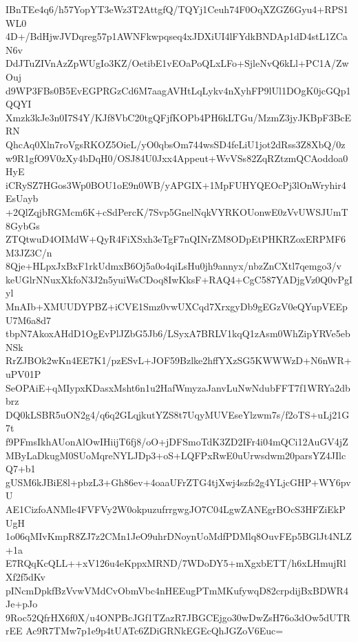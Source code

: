 IBnTEe4q6/h57YopYT3eWz3T2AttgfQ/TQYj1Ceuh74F0OqXZGZ6Gyu4+RPS1WL0
4D+/BdHjwJVDqreg57p1AWNFkwpqseq4xJDXiUI4lFYdkBNDAp1dD4stL1ZCaN6v
DdJTuZIVnAzZpWUgIo3KZ/OetibE1vEOaPoQLxLFo+SjleNvQ6kLl+PC1A/ZwOuj
d9WP3FBs0B5EvEGPRGzCd6M7aagAVHtLqLykv4nXyhFP9lUl1DOgK0jcGQp1QQYI
Xmzk3kJe3n0I7S4Y/KJf8VbC20tgQFjfKOPb4PH6kLTGu/MzmZ3jyJKBpF3BcERN
QhcAq0Xln7roVgsRKOZ5OieL/yO0qbsOm744wsSD4feLiU1jot2dRss3Z8XbQ/0z
w9R1gfO9V0zXy4bDqH0/OSJ84U0Jxx4Appeut+WvVSs82ZqRZtzmQCAoddoa0HyE
iCRySZ7HGos3Wp0BOU1oE9n0WB/yAPGIX+1MpFUHYQEOcPj3lOnWryhir4EsUayb
+2QlZqjbRGMcm6K+cSdPercK/7Svp5GnelNqkVYRKOUonwE0zVvUWSJUmT8GybGs
ZTQtwuD4OIMdW+QyR4FiXSxh3eTgF7nQINrZM8ODpEtPHKRZoxERPMF6M3JZ3C/n
8Qje+HLpxJxBxF1rkUdmxB6Oj5a0o4qiLsHu0jh9annyx/nbzZnCXtl7qemgo3/v
keUGlrNNuxXkfoN3J2n5yuiWsCDoq8IwKksF+RAQ4+CgC587YADjgVz0Q0vPgIyl
MnAIb+XMUUDYPBZ+iCVE1Smz0vwUXCqd7XrxgyDb9gEGzV0eQYupVEEpU7M6a8d7
tbpN7AkoxAHdD1OgEvPlJZbG5Jb6/LSyxA7BRLV1kqQ1zAsm0WhZipYRVe5ebNSk
RrZJBOk2wKn4EE7K1/pzESvL+JOF59Bzlke2hffYXzSG5KWWWzD+N6nWR+uPV01P
SeOPAiE+qMIypxKDasxMsht6n1u2HafWmyzaJanvLuNwNdubFFT7f1WRYa2dbbrz
DQ0kLSBR5uON2g4/q6q2GLqjkutYZS8t7UqyMUVEseYlzwm7s/f2oTS+uLj21G7t
f9PFmsIkhAUonAlOwIHiijT6fj8/oO+jDFSmoTdK3ZD2IFr4i04mQCi12AuGV4jZ
MByLaDkugM0SUoMqreNYLJDp3+oS+LQFPxRwE0uUrwsdwm20parsYZ4JIlcQ7+b1
gUSM6kJBiE8l+pbzL3+Gh86ev+4oaaUFrZTG4tjXwj4szfs2g4YLjcGHP+WY6pvU
AE1CizfoANMle4FVFVy2W0okpuzufrrgwgJO7C04LgwZANEgrBOcS3HFZiEkPUgH
1o06qMIvKmpR8ZJ7z2CMn1JeO9uhrDNoynUoMdfPDMlq8OuvFEp5BGlJt4NLZ+1a
E7RQqKcQLL++xV126u4eKppxMRND/7WDoDY5+mXgxbETT/h6xLHmujRlXf2f5dKv
pINcmDpkfBzVvwVMdCvObmVbc4nHEEugPTmMKufywqD82crpdijBxBDWR4Je+pJo
9Roc52QfrHX6f0X/u4ONPBcJGf1TZazR7JBGCEjgo30wDwZsH76o3dOw5dUTRrEE
Ac9R7TMw7p1e9p4tUATc6ZDiGRNkEGEcQhJGZoV6Euc=
